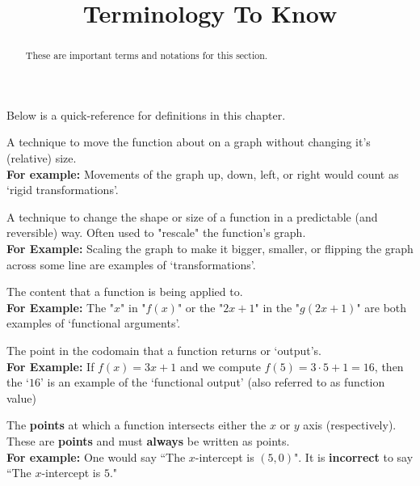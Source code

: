 \documentclass{ximera}
\title{Terminology To Know}
\begin{document}
\begin{abstract}
    These are important terms and notations for this section.
\end{abstract}
\maketitle

Below is a quick-reference for definitions in this chapter.

\begin{definition}
    A technique to move the function about on a graph without changing it's (relative) size. \\
    \textbf{For example:} Movements of the graph up, down, left, or right would count as `rigid transformations'.
\end{definition}

\begin{definition}[Transformation]
    A technique to change the shape or size of a function in a predictable (and reversible) way. Often used to "rescale" the function's graph.\\
    \textbf{For Example:} Scaling the graph to make it bigger, smaller, or flipping the graph across some line are examples of `transformations'.
\end{definition}

\begin{definition}
    The content that a function is being applied to.\\
    \textbf{For Example:} The "$x$" in "$f(x)$" or the "$2x+1$" in the "$g(2x+1)$" are both examples of `functional arguments'.
\end{definition}

\begin{definition}
    The point in the codomain that a function returns or `output's.\\
    \textbf{For Example:} If $f(x) = 3x+1$ and we compute $f(5) = 3\cdot5 + 1 = 16$, then the `$16$' is an example of the `functional output' (also referred to as function value)
\end{definition}

\begin{definition}[(x or y) intercept(s)]
    The \textbf{points} at which a function intersects either the $x$ or $y$ axis (respectively). These are \textbf{points} and must \textbf{always} be written as points. \\
    \textbf{For example:} One would say ``The $x$-intercept is $(5,0)$". It is \textbf{incorrect} to say ``The $x$-intercept is $5$."
\end{definition}
\end{document}
